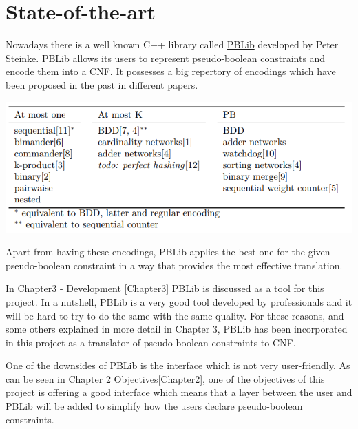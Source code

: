 \section{State-of-the-art}



Nowadays there is a well known C++ library called \href{http://tools.computational-logic.org/content/pblib.php}{PBLib} developed by Peter Steinke. PBLib allows its users to represent pseudo-boolean constraints and encode them into a CNF.  
It possesses a big repertory of encodings which have been proposed in the past in different papers\cite{Steinke2015}.  
\begin{center}
	\includegraphics[width=1\textwidth]{Figures/PBLibEncodings.png}
\end{center}
Apart from having these encodings, PBLib applies the best one for the given pseudo-boolean constraint in a way that provides the most effective translation. 

In Chapter3 - Development \ref{Chapter3} PBLib is discussed as a tool for this project. In a nutshell, PBLib is a very good tool developed by professionals and it will be hard to try to do the same with the same quality. For these reasons, and some others explained in more detail in Chapter 3, PBLib has been incorporated in this project as a translator of pseudo-boolean constraints to CNF.  

One of the downsides of PBLib is the interface which is not very user-friendly. As can be seen in Chapter 2 Objectives\ref{Chapter2}, one of the objectives of this project is offering a good interface which means that a layer between the user and PBLib will be added to simplify how the users declare pseudo-boolean constraints.  



